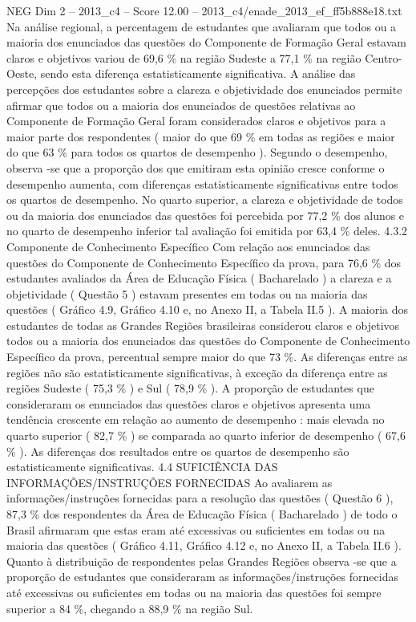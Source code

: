 \begin{textsample}{NEG Dim 2 – 2013\_c4 – Score 12.00 – 2013\_c4/enade\_2013\_ef\_ff5b888e18.txt}
Na análise regional, a percentagem de estudantes que avaliaram que todos ou a maioria dos enunciados das questões do Componente de Formação Geral estavam claros e objetivos variou de 69,6 \% na região Sudeste a 77,1 \% na região Centro-Oeste, sendo esta diferença estatisticamente significativa.
A análise das percepções dos estudantes sobre a clareza e objetividade dos enunciados permite afirmar que todos ou a maioria dos enunciados de questões relativas ao Componente de Formação Geral foram considerados claros e objetivos para a maior parte dos respondentes ( maior do que 69 \% em todas as regiões e maior do que 63 \% para todos os quartos de desempenho ).
Segundo o desempenho, observa -se que a proporção dos que emitiram esta opinião cresce conforme o desempenho aumenta, com diferenças estatisticamente significativas entre todos os quartos de desempenho.
No quarto superior, a clareza e objetividade de todos ou da maioria dos enunciados das questões foi percebida por 77,2 \% dos alunos e no quarto de desempenho inferior tal avaliação foi emitida por 63,4 \% deles. 4.3.2 Componente de Conhecimento Específico Com relação aos enunciados das questões do Componente de Conhecimento Específico da prova, para 76,6 \% dos estudantes avaliados da Área de Educação Física ( Bacharelado ) a clareza e a objetividade ( Questão 5 ) estavam presentes em todas ou na maioria das questões ( Gráfico 4.9, Gráfico 4.10 e, no Anexo II, a Tabela II.5 ).
A maioria dos estudantes de todas as Grandes Regiões brasileiras considerou claros e objetivos todos ou a maioria dos enunciados das questões do Componente de Conhecimento Específico da prova, percentual sempre maior do que 73 \%.
As diferenças entre as regiões não são estatisticamente significativas, à exceção da diferença entre as regiões Sudeste ( 75,3 \% ) e Sul ( 78,9 \% ).
A proporção de estudantes que consideraram os enunciados das questões claros e objetivos apresenta uma tendência crescente em relação ao aumento de desempenho : mais elevada no quarto superior ( 82,7 \% ) se comparada ao quarto inferior de desempenho ( 67,6 \% ).
As diferenças dos resultados entre os quartos de desempenho são estatisticamente significativas. 4.4 SUFICIÊNCIA DAS INFORMAÇÕES/INSTRUÇÕES FORNECIDAS Ao avaliarem as informações/instruções fornecidas para a resolução das questões ( Questão 6 ), 87,3 \% dos respondentes da Área de Educação Física ( Bacharelado ) de todo o Brasil afirmaram que estas eram até excessivas ou suficientes em todas ou na maioria das questões ( Gráfico 4.11, Gráfico 4.12 e, no Anexo II, a Tabela II.6 ).
Quanto à distribuição de respondentes pelas Grandes Regiões observa -se que a proporção de estudantes que consideraram as informações/instruções fornecidas até excessivas ou suficientes em todas ou na maioria das questões foi sempre superior a 84 \%, chegando a 88,9 \% na região Sul.

\end{textsample}
